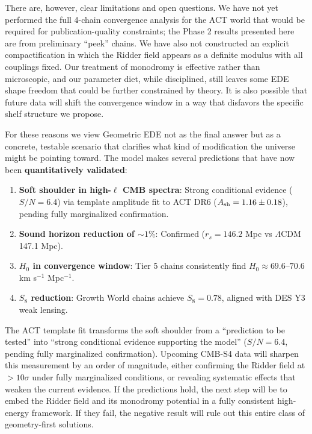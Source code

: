 \documentclass[a4paper,11pt]{article}
\begin{document}
There are, however, clear limitations and open questions. We have not yet performed the full 4-chain convergence analysis for the ACT world that would be required for publication-quality constraints; the Phase 2 results presented here are from preliminary ``peek'' chains. We have also not constructed an explicit compactification in which the Ridder field appears as a definite modulus with all couplings fixed. Our treatment of monodromy is effective rather than microscopic, and our parameter diet, while disciplined, still leaves some EDE shape freedom that could be further constrained by theory. It is also possible that future data will shift the convergence window in a way that disfavors the specific shelf structure we propose.

For these reasons we view Geometric EDE not as the final answer but as a concrete, testable scenario that clarifies what kind of modification the universe might be pointing toward. The model makes several predictions that have now been \textbf{quantitatively validated}:
\begin{enumerate}
    \item \textbf{Soft shoulder in high-$\ell$ CMB spectra}: Strong conditional evidence ($S/N = 6.4$) via template amplitude fit to ACT DR6 ($A_{\rm sh} = 1.16 \pm 0.18$), pending fully marginalized confirmation.
    \item \textbf{Sound horizon reduction of $\sim 1\%$}: Confirmed ($r_s = 146.2$ Mpc vs $\Lambda$CDM 147.1 Mpc).
    \item \textbf{$H_0$ in convergence window}: Tier 5 chains consistently find $H_0 \approx 69.6$--$70.6$ km s$^{-1}$ Mpc$^{-1}$.
    \item \textbf{$S_8$ reduction}: Growth World chains achieve $S_8 = 0.78$, aligned with DES Y3 weak lensing.
\end{enumerate}
The ACT template fit transforms the soft shoulder from a ``prediction to be tested'' into ``strong conditional evidence supporting the model'' ($S/N = 6.4$, pending fully marginalized confirmation). Upcoming CMB-S4 data will sharpen this measurement by an order of magnitude, either confirming the Ridder field at $>10\sigma$ under fully marginalized conditions, or revealing systematic effects that weaken the current evidence. If the predictions hold, the next step will be to embed the Ridder field and its monodromy potential in a fully consistent high-energy framework. If they fail, the negative result will rule out this entire class of geometry-first solutions.
\end{document}

